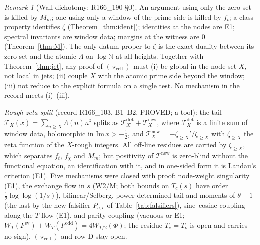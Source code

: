 \documentclass[11pt]{amsart}
\theoremstyle{definition}
\theoremstyle{remark}
\newtheorem{remark}[theorem]{Remark}
\begin{document}
\begin{remark}[Wall dichotomy; R166\_190 \S0]
An argument using only the zero set is killed by $M_m$; one using only a window of the prime side is killed by $f_t$; a class
property identifies $\zeta$ (Theorem~\ref{thm:ident}); identities at the nodes are E1; spectral invariants are window data; margins at
the witness are $0$ (Theorem~\ref{thm:M}). The only datum proper to $\zeta$ is the exact duality between its zero set and the atomic
$\Lambda$ on $\log\mathbb N$ at all heights. Together with Theorem~\ref{thm:jet}, any proof of $(\star_{\mathrm{cell}})$ must (i) be global
in the node set $X$, not local in jets; (ii) couple $X$ with the atomic prime side beyond the window; (iii) not reduce to the explicit
formula on a single test. No mechanism in the record meets (i)--(iii).
\end{remark}

\noindent\emph{Rough-zeta split} (record R166\_103, B1--B2, PROVED; a tool): the tail $\mathcal T_X(x)=\sum_{n\ge X}\Lambda(n)n^{z}$ splits
as $\mathcal T^{\mathrm{det}}_X+\mathcal T^{\mathrm{new}}_X$, where $\mathcal T^{\mathrm{det}}_X$ is a finite sum of window data, holomorphic
in $\mathrm{Im}\,x>-\frac12$, and $\mathcal T^{\mathrm{new}}_X=-\zeta_{\ge X}'/\zeta_{\ge X}$ with $\zeta_{\ge X}$ the zeta function of the
$X$-rough integers. All off-line residues are carried by $\zeta_{\ge X}$, which separates $f_t$, $f_\chi$ and $M_m$; but positivity of
$\mathcal T^{\mathrm{new}}$ is zero-blind without the functional equation, an identification with it, and in one-sided form it is
Landau's criterion (E1). Five mechanisms were closed with proof: node-weight singularity (E1), the exchange flow in $s$ (W2/M; both
bounds on $T_c(s)$ have order $\frac12\log\log(1/s)$), bilinear/Selberg, power-determined tail and moments of $\theta-1$ (the last by the new
falsifier $P_{a,c}$ of Table~\ref{tab:falsifiers}), sine--cosine coupling along the $T$-flow (E1), and parity coupling (vacuous or E1;
$W_T(F^{\mathrm{ev}})+W_T(F^{\mathrm{odd}})=4W_{T/2}(\Phi)$; the residue $T_e=T_o$ is open and carries no sign).
$(\star_{\mathrm{cell}})$ and row D stay open.
\end{document}
